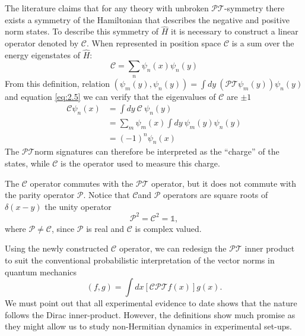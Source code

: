 \documentclass[12pt, a4paper]{report}
\newcommand\PT{\(\mathcal{PT}\)}
\newcommand\PP{\(\mathcal{P}\)}
\newcommand\CC{\(\mathcal{C}\)}
\begin{document}
The literature claims that for any theory with unbroken \PT-symmetry there exists a symmetry of the Hamiltonian that describes the negative and positive norm states. To describe this symmetry of $\hat{H}$ it is necessary to construct a linear operator denoted by \CC\cite{MustaHbeHermitian,ComplexExtension,Bender_2004}. When represented in position space \CC\: is a sum over the energy eigenstates of $\hat{H}$:
\begin{equation}\label{eq:2.8}
\mathcal{C} = \sum_n \psi_n(x)\psi_n(y)
\end{equation}
From this definition, relation $(\psi_m(y), \psi_n(y)) = \int dy\:(\mathcal{PT}\psi_m(y))\psi_n(y)$ and equation \ref{eq:2.5} we can verify that the eigenvalues of \CC\: are $\pm 1$
\begin{align}\label{eq:2.9}
\mathcal{C} \psi_n(x) & = \int dy\:\mathcal{C}\:\psi_n(y)\nonumber \\
& = \sum_{m}\psi_m(x)\int dy\:\psi_m(y) \psi_n(y)\nonumber \\
& = (-1)^n \psi_n(x)
\end{align}
The \PT\:norm signatures can therefore be interpreted as the ``charge'' of the states, while \CC\: is the operator used to measure this charge\cite{Bender_2004}.

The \CC\: operator commutes with the \PT\: operator, but it does not commute with the parity operator \PP. Notice that \CC\:and \PP\: operators are square roots of $\delta(x-y)$ the unity operator\cite{ComplexExtension}
\begin{equation}\label{eq:2.10}
\mathcal{P}^2 = \mathcal{C}^2 = \mathds{1}, 
\end{equation}
where $\mathcal{P} \neq \mathcal{C}$, since \PP\: is real and \CC\: is complex valued\cite{MustaHbeHermitian, Bender_2004}.

Using the newly constructed \CC\: operator, we can redesign the \PT\: inner product to suit the conventional probabilistic interpretation of the vector norms in quantum mechanics
\begin{equation}\label{eq:2.11}
\left( f, g \right ) = \int dx \left [ \mathcal{CPT} f(x) \right ] g(x).
\end{equation}
We must point out that all experimental evidence to date shows that the nature follows the Dirac inner-product\cite{Maximal}. However, the definitions show much promise as they might allow us to study non-Hermitian dynamics in experimental set-ups.

\end{document}
